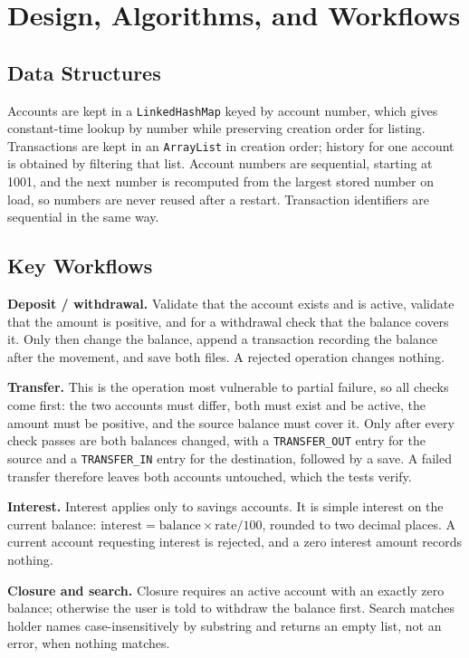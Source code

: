 \documentclass[11pt,a4paper]{report}
\begin{document}
\section{Design, Algorithms, and Workflows}
\label{sec:design}
\subsection{Data Structures}
Accounts are kept in a \texttt{LinkedHashMap} keyed by account number, which gives constant-time lookup by number while preserving creation order for listing. Transactions are kept in an \texttt{ArrayList} in creation order; history for one account is obtained by filtering that list. Account numbers are sequential, starting at 1001, and the next number is recomputed from the largest stored number on load, so numbers are never reused after a restart. Transaction identifiers are sequential in the same way.

\subsection{Key Workflows}
\textbf{Deposit / withdrawal.} Validate that the account exists and is active, validate that the amount is positive, and for a withdrawal check that the balance covers it. Only then change the balance, append a transaction recording the balance after the movement, and save both files. A rejected operation changes nothing.

\textbf{Transfer.} This is the operation most vulnerable to partial failure, so all checks come first: the two accounts must differ, both must exist and be active, the amount must be positive, and the source balance must cover it. Only after every check passes are both balances changed, with a \texttt{TRANSFER\_OUT} entry for the source and a \texttt{TRANSFER\_IN} entry for the destination, followed by a save. A failed transfer therefore leaves both accounts untouched, which the tests verify.

\textbf{Interest.} Interest applies only to savings accounts. It is simple interest on the current balance: $\text{interest} = \text{balance} \times \text{rate} / 100$, rounded to two decimal places. A current account requesting interest is rejected, and a zero interest amount records nothing.

\textbf{Closure and search.} Closure requires an active account with an exactly zero balance; otherwise the user is told to withdraw the balance first. Search matches holder names case-insensitively by substring and returns an empty list, not an error, when nothing matches.
\end{document}
